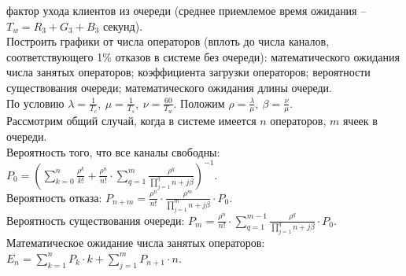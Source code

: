 \documentclass{article}
\begin{document}
фактор ухода клиентов из очереди (среднее приемлемое время ожидания – \begin{math}T_w = R_3 + G_3 + B_3\end{math} секунд). \\Построить графики от числа операторов (вплоть до числа
каналов, соответствующего 1\% отказов в системе без очереди):
математического ожидания числа занятых операторов; коэффициента загрузки
операторов; вероятности существования очереди; математического ожидания
длины очереди.
\newpage
\noindent\textbf {}
\vspace{\baselineskip}
\\
По условию \begin{math} \lambda = \displaystyle\frac{1}{T_c}, \ \mu = \displaystyle\frac{1}{T_s}, \ \nu = \displaystyle\frac{60}{T_w}\end{math}. Положим \begin{math}\rho = \displaystyle\frac{\lambda}{\mu}, \ \beta = \displaystyle\frac{\nu}{\mu}\end{math}.
\vspace{\baselineskip}
\\
Рассмотрим общий случай, когда в системе имеется \begin{math}n \end{math} операторов, \begin{math}m \end{math} ячеек в очереди. \\ Вероятность того, что все каналы свободны: \begin{math} P_0 = \left(\displaystyle\sum^n_{k=0} \displaystyle\frac{\rho^k}{ k!} + \displaystyle\frac{\rho^{n}}{n!} \cdot\sum^m_{q=1}\displaystyle\frac{\rho^q}{\displaystyle\prod\limits_{j = 1}^qn + j\beta} \right)^{-1}\end{math}. \\Вероятность отказа: \begin{math}P_{n+m} = \displaystyle\frac{\rho^{n}}{n!} \cdot\displaystyle\frac{\rho^m}{\displaystyle\prod\limits_{j = 1}^mn + j\beta} \cdot P_0\end{math}. \\
Вероятность существования очереди: \begin{math}P_m = \displaystyle\frac{\rho^{n}}{n!} \cdot\sum^{m-1}_{q=1}\displaystyle\frac{\rho^q}{\displaystyle\prod\limits_{j = 1}^qn + j\beta} \cdot P_0\end{math}.\\
Математическое ожидание числа занятых операторов: \begin{math}E_n = \displaystyle\sum_{k = 1}^n P_k \cdot k  + \displaystyle\sum_{j = 1}^m P_{n+1} \cdot n \end{math}. \\
\end{document}
